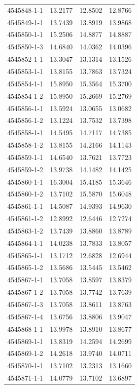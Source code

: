 \begin{longtable}{lrrr}
4545848-1-1 & 13.2177 & 12.8502 & 12.8766 \\
4545849-1-1 & 13.7439 & 13.8919 & 13.9868 \\
4545850-1-1 & 15.2506 & 14.8877 & 14.8887 \\
4545850-1-3 & 14.6840 & 14.0362 & 14.0396 \\
4545852-1-1 & 13.3047 & 13.1314 & 13.1526 \\
4545853-1-1 & 13.8155 & 13.7863 & 13.7324 \\
4545854-1-1 & 15.8950 & 15.3564 & 15.3700 \\
4545854-1-2 & 15.8950 & 15.2669 & 15.2769 \\
4545856-1-1 & 13.5924 & 13.0655 & 13.0682 \\
4545856-1-2 & 13.1224 & 13.7532 & 13.7398 \\
4545858-1-1 & 14.5495 & 14.7117 & 14.7385 \\
4545858-1-2 & 13.8155 & 14.2166 & 14.1143 \\
4545859-1-1 & 14.6540 & 13.7621 & 13.7723 \\
4545859-1-2 & 13.9738 & 14.1482 & 14.1425 \\
4545860-1-1 & 16.3004 & 15.4185 & 15.3646 \\
4545860-1-2 & 13.7102 & 15.5870 & 15.6048 \\
4545861-1-1 & 14.5087 & 14.9393 & 14.9630 \\
4545861-1-2 & 12.8992 & 12.6446 & 12.7274 \\
4545863-1-2 & 13.7439 & 13.8860 & 13.8789 \\
4545864-1-1 & 14.0238 & 13.7833 & 13.8057 \\
4545865-1-1 & 13.1712 & 12.6828 & 12.6944 \\
4545865-1-2 & 13.5686 & 13.5445 & 13.5462 \\
4545867-1-1 & 13.7058 & 13.8597 & 13.8379 \\
4545867-1-2 & 13.7058 & 13.7742 & 13.7639 \\
4545867-1-3 & 13.7058 & 13.8611 & 13.8763 \\
4545867-1-4 & 13.6756 & 13.8806 & 13.9047 \\
4545868-1-1 & 13.9978 & 13.8910 & 13.8677 \\
4545869-1-1 & 13.8319 & 14.2594 & 14.2699 \\
4545869-1-2 & 14.2618 & 13.9740 & 14.0711 \\
4545870-1-1 & 13.7102 & 13.2313 & 13.1660 \\
4545871-1-1 & 14.0779 & 13.7102 & 13.6897 \\

\end{longtable}
